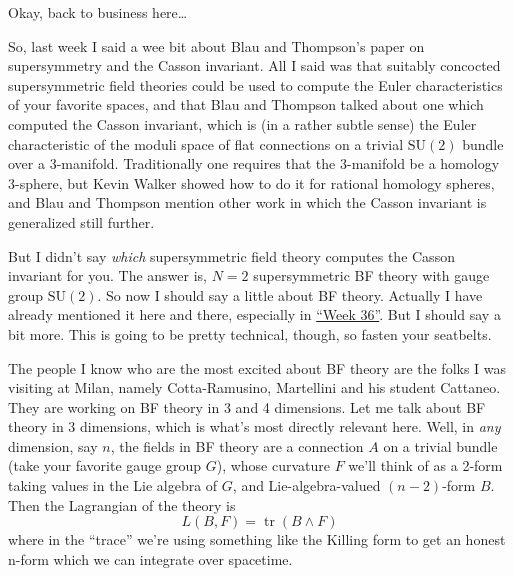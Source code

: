 \documentclass{article}
\renewcommand{\texttt}[1]{%
  \begingroup
  \ttfamily
  \begingroup\lccode`~=`/\lowercase{\endgroup\def~}{/\discretionary{}{}{}}%
  \begingroup\lccode`~=`[\lowercase{\endgroup\def~}{[\discretionary{}{}{}}%
  \begingroup\lccode`~=`.\lowercase{\endgroup\def~}{.\discretionary{}{}{}}%
  \catcode`/=\active\catcode`[=\active\catcode`.=\active
  \scantokens{#1\noexpand}%
  \endgroup
}
\begin{document}
Okay, back to business here\ldots{}


So, last week I said a wee bit about Blau and Thompson's paper on
supersymmetry and the Casson invariant. All I said was that suitably
concocted supersymmetric field theories could be used to compute the
Euler characteristics of your favorite spaces, and that Blau and
Thompson talked about one which computed the Casson invariant, which is
(in a rather subtle sense) the Euler characteristic of the moduli space
of flat connections on a trivial \(\mathrm{SU}(2)\) bundle over a
3-manifold. Traditionally one requires that the 3-manifold be a homology
3-sphere, but Kevin Walker showed how to do it for rational homology
spheres, and Blau and Thompson mention other work in which the Casson
invariant is generalized still further.

But I didn't say \emph{which} supersymmetric field theory computes the
Casson invariant for you. The answer is, \(N = 2\) supersymmetric BF
theory with gauge group \(\mathrm{SU}(2)\). So now I should say a little
about BF theory. Actually I have already mentioned it here and there,
especially in \protect\hyperlink{week36}{``Week 36''}. But I should say
a bit more. This is going to be pretty technical, though, so fasten your
seatbelts.

The people I know who are the most excited about BF theory are the folks
I was visiting at Milan, namely Cotta-Ramusino, Martellini and his
student Cattaneo. They are working on BF theory in 3 and 4 dimensions.
Let me talk about BF theory in 3 dimensions, which is what's most
directly relevant here. Well, in \emph{any} dimension, say \(n\), the
fields in BF theory are a connection \(A\) on a trivial bundle (take
your favorite gauge group \(G\)), whose curvature \(F\) we'll think of
as a 2-form taking values in the Lie algebra of \(G\), and
Lie-algebra-valued \((n-2)\)-form \(B\). Then the Lagrangian of the
theory is \[L(B,F) = \operatorname{tr}(B \wedge F)\] where in the
``trace'' we're using something like the Killing form to get an honest
n-form which we can integrate over spacetime.
\end{document}
